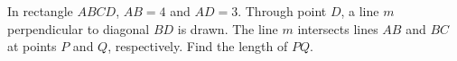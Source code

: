 In rectangle $ABCD$, $AB=4$ and $AD=3$. Through point $D$, a line $m$ perpendicular to diagonal $BD$ is drawn. The line $m$ intersects lines $AB$ and $BC$ at points $P$ and $Q$, respectively. Find the length of $PQ$.
